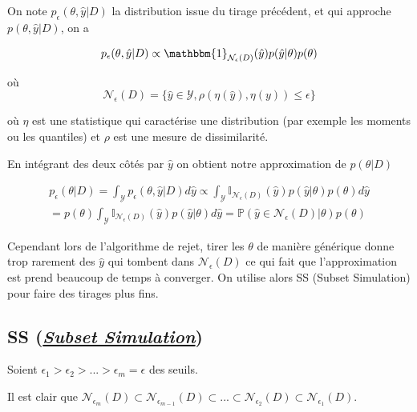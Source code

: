 \documentclass[french,12pt]{article}
\let\oldsubsection\subsection%
\renewcommand{\subsection}{%
  \renewcommand{\theequation}{\thesubsection.\arabic{equation}}%
  \oldsubsection}%
\begin{document}
On note $p_{\epsilon} (\theta, \hat{y} | D)$ la distribution issue
du tirage précédent, et qui approche $p(\theta, \hat{y} |D)$, on a

\begin{equation}
    p_{\epsilon} (\theta , \hat{y} | D) \propto \mathbbm{1}_{\mathcal{N}_{\epsilon}(D)} (\hat{y}) p(\hat{y} | \theta)
    p(\theta)  
\end{equation}

où 
\begin{equation}
    \mathcal{N}_{\epsilon}(D) = \{\hat{y} \in \mathcal{Y}, \rho(\eta(\hat{y}), \eta(y)) \leq \epsilon\}  
\end{equation}


où $\eta$ est une statistique qui caractérise une distribution
(par exemple les moments ou les quantiles) et $\rho$ est une mesure de dissimilarité.

En intégrant des deux côtés par $\hat{y}$ on obtient notre approximation de $p(\theta | D)$


\begin{align}
    p_{\epsilon}( \theta | D) = \int_{\mathcal{Y}} p_{\epsilon}( \theta , \hat{y}| D) d \hat{y} \propto \int_{\mathcal{Y}} \mathbb{I}_{\mathcal{N}_\epsilon (D)} (\hat{y}) p( \hat{y}| \theta) p( \theta) d \hat{y}  \\
    = p( \theta) \int_{\mathcal{Y}} \mathbb{I}_{\mathcal{N}_\epsilon (D)} (\hat{y})  p( \hat{y}| \theta) d \hat{y} = \mathbb{P} (\hat{y} \in \mathcal{N}_{\epsilon} (D)| \theta) p( \theta) 
\end{align}


Cependant lors de l'algorithme de rejet, tirer les $\theta$ de manière générique donne trop rarement des $\hat{y}$ qui tombent dans $\mathcal{N}_{\epsilon} (D)$
ce qui fait que l'approximation est prend beaucoup de temps à converger. On utilise alors SS (Subset Simulation)
pour faire des tirages plus fins.

\subsection{SS (\href{https://en.wikipedia.org/wiki/Subset_simulation}{\textit{Subset Simulation}})}

Soient $\epsilon_1 > \epsilon_2 > ... >\epsilon_m = \epsilon$ des seuils.

Il est clair que $\mathcal{N}_{\epsilon_m} (D)\subset \mathcal{N}_{\epsilon_{m - 1}} (D)
    \subset ... \subset \mathcal{N}_{\epsilon_{2}} (D) \subset \mathcal{N}_{\epsilon_{1}} (D)$.
\end{document}
